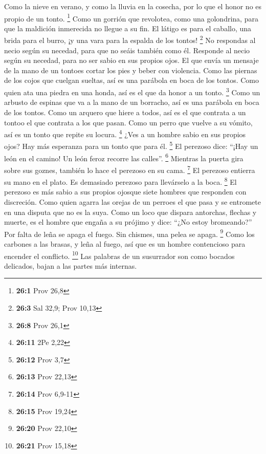  Como la nieve en verano, y como la lluvia en la cosecha,
por lo que el honor no es propio de un tonto. \footnote{\textbf{26:1}
  Prov 26,8}  Como un gorrión que revolotea, como una
golondrina, para que la maldición inmerecida no llegue a su fin.
 El látigo es para el caballo, una brida para el burro, ¡y
una vara para la espalda de los tontos! \footnote{\textbf{26:3} Sal
  32,9; Prov 10,13}  No respondas al necio según su
necedad, para que no seáis también como él.  Responde al
necio según su necedad, para no ser sabio en sus propios ojos.
 El que envía un mensaje de la mano de un tontoes cortar
los pies y beber con violencia.  Como las piernas de los
cojos que cuelgan sueltas, así es una parábola en boca de los tontos.
 Como quien ata una piedra en una honda, así es el que da
honor a un tonto. \footnote{\textbf{26:8} Prov 26,1}  Como
un arbusto de espinas que va a la mano de un borracho, así es una
parábola en boca de los tontos.  Como un arquero que
hiere a todos, así es el que contrata a un tontoo el que contrata a los
que pasan.  Como un perro que vuelve a su vómito, así es
un tonto que repite su locura. \footnote{\textbf{26:11} 2Pe 2,22}
 ¿Ves a un hombre sabio en sus propios ojos? Hay más
esperanza para un tonto que para él. \footnote{\textbf{26:12} Prov 3,7}
 El perezoso dice: ``¡Hay un león en el camino! Un león
feroz recorre las calles''. \footnote{\textbf{26:13} Prov 22,13}
 Mientras la puerta gira sobre sus goznes, también lo
hace el perezoso en su cama. \footnote{\textbf{26:14} Prov 6,9-11}
 El perezoso entierra su mano en el plato. Es demasiado
perezoso para llevárselo a la boca. \footnote{\textbf{26:15} Prov 19,24}
 El perezoso es más sabio a sus propios ojosque siete
hombres que responden con discreción.  Como quien agarra
las orejas de un perroes el que pasa y se entromete en una disputa que
no es la suya.  Como un loco que dispara antorchas,
flechas y muerte,  es el hombre que engaña a su prójimo y
dice: ``¿No estoy bromeando?''  Por falta de leña se
apaga el fuego. Sin chismes, una pelea se apaga. \footnote{\textbf{26:20}
  Prov 22,10}  Como los carbones a las brasas, y leña al
fuego, así que es un hombre contencioso para encender el conflicto.
\footnote{\textbf{26:21} Prov 15,18}  Las palabras de un
susurrador son como bocados delicados, bajan a las partes más internas.
